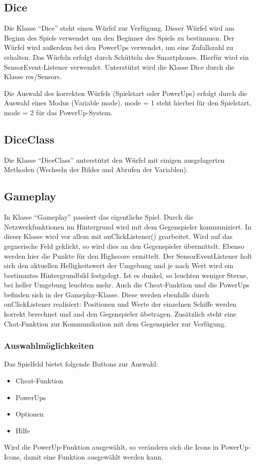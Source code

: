 \documentclass[11pt]{article} %
\begin{document}
\subsection{Dice}
Die Klasse \enquote{Dice} steht einen Würfel zur Verfügung. Dieser Würfel wird am Beginn des Spiels verwendet um den Beginner des Spiels zu bestimmen. Der Würfel wird außerdem bei den PowerUps verwendet, um eine Zufallszahl zu erhalten.
Das Würfeln erfolgt durch Schütteln des Smartphones. Hierfür wird ein SensorEvent-Listener verwendet. Unterstützt wird die Klasse Dice durch die Klasse res/Sensors.

Die Auswahl des korrekten Würfels (Spielstart oder PowerUps) erfolgt durch die Auswahl eines Modus (Variable mode). mode = 1 steht hierbei für den Spielstart, mode = 2 für das PowerUp-System.

\subsection{DiceClass}
Die Klasse \enquote{DiceClass} unterstützt den Würfel mit einigen ausgelagerten Methoden (Wechseln der Bilder und Abrufen der Variablen).

\subsection{Gameplay}
In Klasse \enquote{Gameplay} passiert das eigentliche Spiel. Durch die Netzwerkfunktionen im Hintergrund wird mit dem Gegenspieler kommuniziert. In dieser Klasse wird vor allem mit onClickListener() gearbeitet. Wird auf das gegnerische Feld geklickt, so wird dies an den Gegenspieler übermittelt. Ebenso werden hier die Punkte für den Highscore ermittelt.
Der SensorEventListener holt sich den aktuellen Helligkeitswert der Umgebung und je nach Wert wird ein bestimmtes Hintergrundbild festgelegt. Ist es dunkel, so leuchten weniger Sterne, bei heller Umgebung leuchten mehr.
Auch die Cheat-Funktion und die PowerUps befinden sich in der Gameplay-Klasse. Diese werden ebenfalls durch onClickListener realisiert: Positionen und Werte der einzelnen Schiffe werden korrekt berechnet und and den Gegenspieler übetragen.
Zusätzlich steht eine Chat-Funktion zur Kommunikation mit dem Gegenspieler zur Verfügung.

\subsubsection{Auswahlmöglichkeiten}
Das Spielfeld bietet folgende Buttons zur Auswahl:
\begin{itemize}
\item Cheat-Funktion
\item PowerUps
\item Optionen
\item Hilfe
\end{itemize}
Wird die PowerUp-Funktion ausgewählt, so verändern sich die Icons in PowerUp-Icons, damit eine Funktion ausgewählt werden kann.
\end{document}
